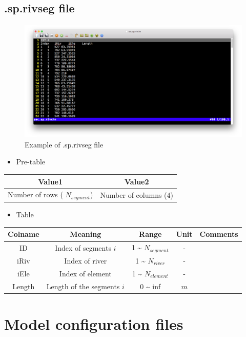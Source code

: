 \documentclass[]{scrbook}
\providecommand{\tightlist}{%
  \setlength{\itemsep}{0pt}\setlength{\parskip}{0pt}}
\begin{document}
\subsection{.sp.rivseg file}\label{sp.rivseg-file}

\begin{figure}
\centering
\includegraphics{Fig/IO/sp.rivchn.png}
\caption{Example of .sp.rivseg file}
\end{figure}

\begin{itemize}
\tightlist
\item
  Pre-table
\end{itemize}

\begin{longtable}[]{@{}cc@{}}
\toprule
Value1 & Value2\tabularnewline
\midrule
\endhead
Number of rows ( \(N_{segment}\)) & Number of columns
(\(4\))\tabularnewline
\bottomrule
\end{longtable}

\begin{itemize}
\tightlist
\item
  Table
\end{itemize}

\begin{longtable}[]{@{}ccccc@{}}
\toprule
Colname & Meaning & Range & Unit & Comments\tabularnewline
\midrule
\endhead
ID & Index of segments \(i\) & 1 \textasciitilde{} \(N_{segment}\) & -
&\tabularnewline
iRiv & Index of river & 1 \textasciitilde{} \(N_{river}\) & -
&\tabularnewline
iEle & Index of element & 1 \textasciitilde{} \(N_{element}\) & -
&\tabularnewline
Length & Length of the segments \(i\) & 0 \textasciitilde{} inf & \(m\)
&\tabularnewline
\bottomrule
\end{longtable}

\section{Model configuration files}\label{model-configuration-files}
\end{document}
